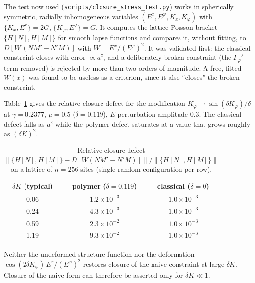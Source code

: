 \documentclass[12pt]{article}
\begin{document}
The test now used (\texttt{scripts/closure\_stress\_test.py}) works in spherically symmetric, radially inhomogeneous variables $(E^x,E^\varphi,K_x,K_\varphi)$ with $\{K_x,E^x\}=2G$, $\{K_\varphi,E^\varphi\}=G$.  It computes the lattice Poisson bracket $\{H[N],H[M]\}$ for smooth lapse functions and compares it, without fitting, to $D\!\left[W\,(NM'-N'M)\right]$ with $W=E^x/(E^\varphi)^2$.  It was validated first: the classical constraint closes with error $\propto a^2$, and a deliberately broken constraint (the $\Gamma_\varphi'$ term removed) is rejected by more than two orders of magnitude.  A free, fitted $W(x)$ was found to be useless as a criterion, since it also ``closes'' the broken constraint.

Table~\ref{tab:closure_anomaly} gives the relative closure defect for the modification $K_\varphi\to\sin(\delta K_\varphi)/\delta$ at $\gamma=0.2377$, $\mu=0.5$ ($\delta=0.119$), $E$-perturbation amplitude $0.3$.  The classical defect falls as $a^2$ while the polymer defect saturates at a value that grows roughly as $(\delta K)^2$.

\begin{table}[h]
\centering
\caption{Relative closure defect $\|\{H[N],H[M]\}-D[W(NM'-N'M)]\|/\|\{H[N],H[M]\}\|$ on a lattice of $n=256$ sites (single random configuration per row).}
\label{tab:closure_anomaly}
\begin{tabular}{ccc}
\toprule
$\delta K$ (typical) & polymer ($\delta=0.119$) & classical ($\delta=0$) \\
\midrule
0.06 & $1.2\times10^{-3}$ & $1.0\times10^{-3}$ \\
0.24 & $4.3\times10^{-3}$ & $1.0\times10^{-3}$ \\
0.59 & $2.3\times10^{-2}$ & $1.0\times10^{-3}$ \\
1.19 & $9.3\times10^{-2}$ & $1.0\times10^{-3}$ \\
\bottomrule
\end{tabular}
\end{table}

Neither the undeformed structure function nor the deformation $\cos(2\delta K_\varphi)\,E^x/(E^\varphi)^2$ restores closure of the naive constraint at large $\delta K$.  Closure of the naive form can therefore be asserted only for $\delta K\ll1$.
\end{document}
